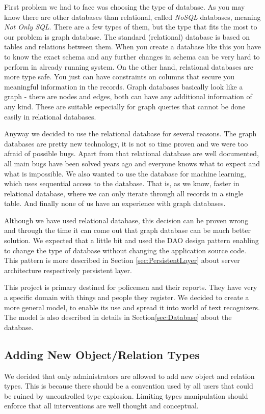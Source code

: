 First problem we had to face was choosing the type of database. As you may know
there are other databases than relational, called \emph{NoSQL} databases,
meaning \emph{Not Only SQL}. There are a few types of them, but the type that
fits the most to our problem is graph database. The standard (relational)
database is based on tables and relations between them. When you create a
database like this you have to know the exact schema and any further changes in
schema can be very hard to perform in already running system. On the other hand,
relational databases are more type safe. You just can have constraints on
columns that secure you meaningful information in the records. Graph databases
basically look like a graph - there are nodes and edges, both can have any
additional information of any kind. These are suitable especially for graph
queries that cannot be done easily in relational databases.

Anyway we decided to use the relational database for several reasons.
The graph databases are pretty new technology, it is not so time proven and we
were too afraid of possible bugs. Apart from that relational database are well
documented, all main bugs have been solved years ago and everyone knows what to
expect and what is impossible.
We also wanted to use the database for machine learning, which uses sequential
access to the database. That is, as we know, faster in relational database,
where we can only iterate through all records in a single table.
And finally none of us have an experience with graph databases.

Although we have used relational database, this decision can be proven wrong and
through the time it can come out that graph database can be much better
solution. We expected that a little bit and used the DAO design pattern enabling
to change the type of database without changing the application source code.
This pattern is more described in Section \ref{sec:PersistentLayer} about server
architecture respectively persistent layer.

This project is primary destined for policemen and their reports. They have very
a specific domain with things and people they register. We decided to create
a more general model, to enable its use and spread it into world of text
recognizers. The model is also described in details in Section\ref{sec:Database}
about the database.

\subsection{Adding New Object/Relation Types}
\label{ssec:AddingTypes}


We decided that only administrators are allowed to add new object and relation
types. This is because there should be a convention used by all users that could
be ruined by uncontrolled type explosion. Limiting types manipulation should
enforce that all interventions are well thought and conceptual.
